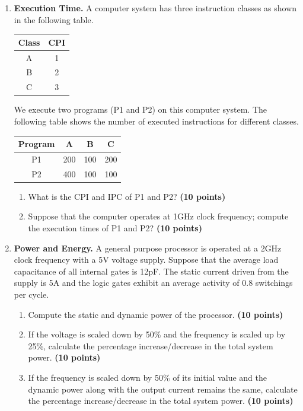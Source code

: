 \documentclass[a4paper, 15pt]{exam}
\begin{document}
\begin{enumerate}
\begin{enumerate}
	\end{enumerate}
    \item \textbf{Execution Time.} A computer system has three instruction classes as shown in the following table.
\begin{center}
\begin{tabular}{ |c|c|} 
 \hline
  
  Class&CPI\\ 
  \hline
 A&1\\ 
 \hline
 B&2\\ 
 \hline
 C&3\\ 
 \hline
\end{tabular}
\end{center}
We execute two programs (P1 and P2) on this computer system. The following table shows the number of executed instructions for different classes.

\begin{center}
\begin{tabular}{ |c|c|c|c|} 
 \hline
  
  Program&A&B&C\\ 
  \hline
 P1&200&100&200\\ 
 \hline
 P2&400&100&100\\ 
 \hline
 
\end{tabular}
\end{center}
\begin{enumerate}
\item What is the CPI and IPC of P1 and P2?
\textbf{(10 points)} \\
\item Suppose that the computer operates at 1GHz clock frequency; compute the execution times of P1 and P2? 
 \textbf {(10 points)} \\

\end{enumerate}
    \item \textbf{Power and Energy.} A general purpose processor is operated at a 2GHz clock frequency with a 5V voltage supply. Suppose that the average load capacitance of all internal gates is 12pF. The static current driven from the supply is 5A and the logic gates exhibit an average activity of 0.8 switchings per cycle.
    \begin{enumerate}
    \item Compute the static and dynamic power of the processor. \textbf{(10 points)} \\
        \item If the voltage is scaled down by 50\% and the frequency is scaled up by 25\%, calculate the percentage increase/decrease in the total system power.   \textbf{(10 points)} \\
        \item If the frequency is scaled down by 50\% of its initial value and the dynamic power along with the output current remains the same, calculate the percentage increase/decrease in the total system power.  \textbf{(10 points)} \\
        


\end{enumerate}
\end{enumerate}
\end{document}
